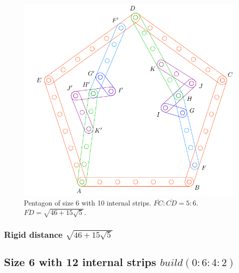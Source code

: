 \documentclass[11pt]{article}
\begin{document}
\begin{figure}[H]
\centering
\includegraphics[scale=0.7]{6/penta6-10a}
\caption{Pentagon of size 6 with 10 internal strips. $\overline{FC} : \overline{CD} = 5:6$. $\overline{FD} = \sqrt{46 + 15\sqrt5}$.}
\label{fig:penta6-10a}
\end{figure}

\subsubsection{Rigid distance $\sqrt{46 + 15\sqrt5}$}

\subsection{Size 6 with 12 internal strips $build(0:6:4:2)$}
\end{document}
